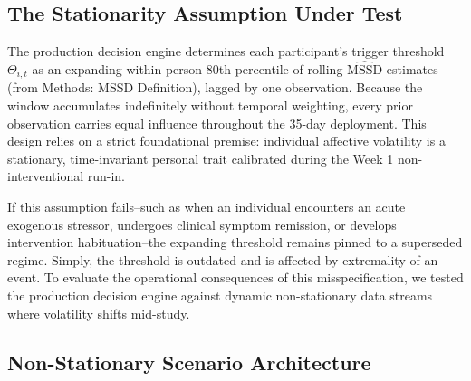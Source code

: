 \documentclass[11pt,letterpaper]{article}
\begin{document}
\subsection{The Stationarity Assumption Under Test}

The production decision engine determines each participant's trigger threshold $\Theta_{i,t}$ as an expanding within-person 80th percentile of rolling $\widehat{\text{MSSD}}$ estimates (from Methods: MSSD Definition), lagged by one observation. Because the window accumulates indefinitely without temporal weighting, every prior observation carries equal influence throughout the 35-day deployment. This design relies on a strict foundational premise: individual affective volatility is a stationary, time-invariant personal trait calibrated during the Week 1 non-interventional run-in.

If this assumption fails--such as when an individual encounters an acute exogenous stressor, undergoes clinical symptom remission, or develops intervention habituation--the expanding threshold remains pinned to a superseded regime. Simply, the threshold is outdated and is affected by extremality of an event. To evaluate the operational consequences of this misspecification, we tested the production decision engine against dynamic non-stationary data streams where volatility shifts mid-study.

\subsection{Non-Stationary Scenario Architecture}
\end{document}
